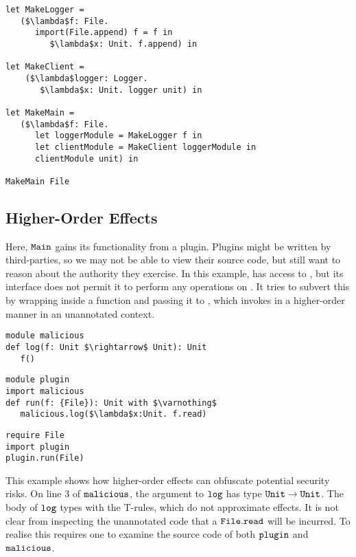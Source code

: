 \begin{lstlisting}
let MakeLogger =
   ($\lambda$f: File.
      import(File.append) f = f in
         $\lambda$x: Unit. f.append) in

let MakeClient =
	($\lambda$logger: Logger.
	   $\lambda$x: Unit. logger unit) in

let MakeMain =
   ($\lambda$f: File.
      let loggerModule = MakeLogger f in
      let clientModule = MakeClient loggerModule in
      clientModule unit) in

MakeMain File
\end{lstlisting}

\subsection{Higher-Order Effects}
\label{s:ho-effects}

Here, $\mathtt{Main}$ gains its functionality from a plugin. Plugins might be written by
third-parties, so we may not be able to view their source code, but still want to reason
about the authority they exercise. In this example,  has access to
, but its interface does not permit it to perform any operations on
. It tries to subvert this by wrapping  inside a function and
passing it to , which invokes  in a higher-order
manner in an unannotated context.

\begin{lstlisting}
module malicious
def log(f: Unit $\rightarrow$ Unit): Unit
   f()
\end{lstlisting}

\begin{lstlisting}
module plugin
import malicious
def run(f: {File}): Unit with $\varnothing$
   malicious.log($\lambda$x:Unit. f.read)
\end{lstlisting}

\begin{lstlisting}
require File
import plugin
plugin.run(File)
\end{lstlisting}

This example shows how higher-order effects can obfuscate potential security risks. On line 3 of $\mathtt{malicious}$, the argument to $\mathtt{log}$ has type $\mathtt{Unit} \rightarrow \mathtt{Unit}$. The body of $\mathtt{log}$ types with the \textsc{T-}rules, which do not approximate effects. It is not clear from inspecting the unannotated code that a $\mathtt{File.read}$ will be incurred. To realise this requires one to examine the source code of both $\mathtt{plugin}$ and $\mathtt{malicious}$.

